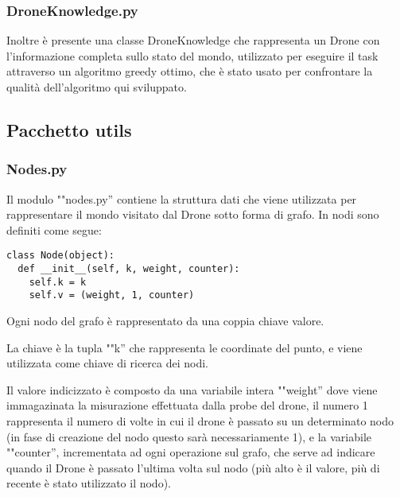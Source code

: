 \subsubsection{DroneKnowledge.py}
Inoltre è presente una classe DroneKnowledge che rappresenta un Drone con l'informazione completa sullo stato del mondo, utilizzato per eseguire il task attraverso un algoritmo greedy ottimo, che è stato usato per confrontare la qualità dell'algoritmo qui sviluppato.

\subsection{Pacchetto utils}

\subsubsection{Nodes.py}
Il modulo ""nodes.py'' contiene la struttura dati che viene utilizzata per rappresentare il mondo visitato dal Drone sotto forma di grafo. In nodi sono definiti come segue:
\begin{verbatim} 
class Node(object):
  def __init__(self, k, weight, counter):
    self.k = k
    self.v = (weight, 1, counter)
\end{verbatim}
Ogni nodo del grafo è rappresentato da una coppia chiave valore. 

La chiave è la tupla ""k'' che rappresenta le coordinate del punto, e viene utilizzata come chiave di ricerca dei nodi. 

Il valore indicizzato è composto da una variabile intera ""weight'' dove viene immagazinata la misurazione effettuata dalla probe del drone, il numero 1 rappresenta il numero di volte in cui il drone è passato su un determinato nodo (in fase di creazione del nodo questo sarà necessariamente 1), e la variabile ""counter'', incrementata ad ogni operazione sul grafo, che serve ad indicare quando il Drone è passato l'ultima volta sul nodo (più alto è il valore, più di recente è stato utilizzato il nodo). 

